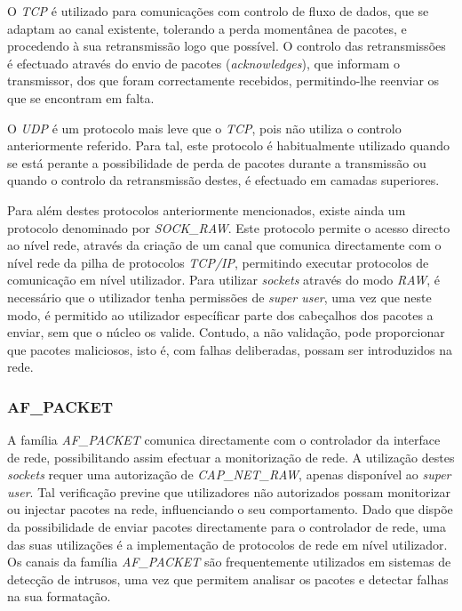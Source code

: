 O \textit{TCP} é utilizado para comunicações com controlo de fluxo de dados, que se adaptam ao canal existente, tolerando a perda momentânea de pacotes, e procedendo à sua retransmissão logo que possível.
O controlo das retransmissões é efectuado através do envio de pacotes (\textit{acknowledges}), que informam o transmissor, dos que foram correctamente recebidos, permitindo-lhe reenviar os que se encontram em falta.

O \textit{UDP} é um protocolo mais leve que o \textit{TCP}, pois não utiliza o controlo anteriormente referido.
Para tal, este protocolo é habitualmente utilizado quando se está perante a possibilidade de perda de pacotes durante a transmissão ou quando o controlo da retransmissão destes, é efectuado em camadas superiores.

Para além destes protocolos anteriormente mencionados, existe ainda um protocolo denominado por \textit{SOCK\_RAW}.
Este protocolo permite o acesso directo ao nível rede, através da criação de um canal que comunica directamente com o nível rede da pilha de protocolos \textit{TCP/IP}, permitindo executar protocolos de comunicação em nível utilizador.
Para utilizar \textit{sockets} através do modo \textit{RAW}, é necessário que o utilizador tenha permissões de \textit{super user}, uma vez que neste modo, é permitido ao utilizador específicar parte dos cabeçalhos dos pacotes a enviar, sem que o núcleo os valide.
Contudo, a não validação, pode proporcionar que pacotes maliciosos, isto é, com falhas deliberadas, possam ser introduzidos na rede.
 
\subsubsection{AF\_PACKET}
\label{subsub:af_packet}

A família \textit{AF\_PACKET} comunica directamente com o controlador da interface de rede, possibilitando assim efectuar a monitorização de rede.
A utilização destes \textit{sockets} requer uma autorização de \textit{CAP\_NET\_RAW}, apenas disponível ao \textit{super user}.
Tal verificação previne que utilizadores não autorizados possam monitorizar ou injectar pacotes na rede, influenciando o seu comportamento.
Dado que dispõe da possibilidade de enviar pacotes directamente para o controlador de rede, uma das suas utilizações é a implementação de protocolos de rede em nível utilizador.
Os canais da família \textit{AF\_PACKET} são frequentemente utilizados em sistemas de detecção de intrusos, uma vez que permitem analisar os pacotes e detectar falhas na sua formatação.

